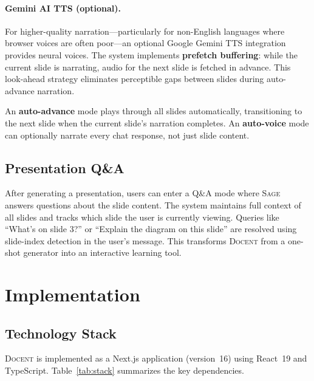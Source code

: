 \documentclass[11pt,a4paper]{article}
\newcommand{\system}{\textsc{Docent}\xspace}
\newcommand{\sage}{\textsc{Sage}\xspace}
\begin{document}
\paragraph{Gemini AI TTS (optional).}
For higher-quality narration---particularly for non-English languages where browser voices are often poor---an optional Google Gemini TTS integration provides neural voices.
The system implements \textbf{prefetch buffering}: while the current slide is narrating, audio for the next slide is fetched in advance.
This look-ahead strategy eliminates perceptible gaps between slides during auto-advance narration.

An \textbf{auto-advance} mode plays through all slides automatically, transitioning to the next slide when the current slide's narration completes.
An \textbf{auto-voice} mode can optionally narrate every chat response, not just slide content.

\subsection{Presentation Q\&A}
\label{sec:qa}

After generating a presentation, users can enter a Q\&A mode where \sage answers questions about the slide content.
The system maintains full context of all slides and tracks which slide the user is currently viewing.
Queries like ``What's on slide 3?'' or ``Explain the diagram on this slide'' are resolved using slide-index detection in the user's message.
This transforms \system from a one-shot generator into an interactive learning tool.



\section{Implementation}
\label{app:implementation}


\subsection{Technology Stack}

\system is implemented as a Next.js application (version~16) using React~19 and TypeScript.
Table~\ref{tab:stack} summarizes the key dependencies.
\end{document}
